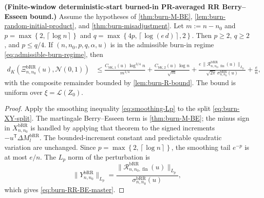 \begin{theorem}\label{thm:burn-RR-BE-master}
  \textbf{(Finite-window deterministic-start burned-in PR-averaged RR Berry--Esseen bound.)}
  Assume the hypotheses of \cref{thm:burn-M-BE}, \cref{lem:burn-random-initial-product},
  and \cref{thm:burn-misadjustment}. Let
  $m := n - n_{0}$ and
  $p = \max\left\{2, \left\lceil \log n \right\rceil\right\}$ and
  $q = \max\left\{4 p, \left\lceil \log\left(e \, d\right) \right\rceil, 2\right\}$. Then $p \ge 2$, $q \ge 2$, and
  $p \le q / 4$. If $(n,n_{0},p,q,\alpha,u)$ is in the admissible burn-in
  regime \eqref{eq:admissible-burn-regime}, then
  \begin{equation}
\begin{aligned}
d_{K} \left( \Xi_{n,n_{0}}^{\mathrm{bRR}}(u), \mathcal{N}(0, 1) \right)
    &\le \frac{C_{\mathrm{bK,1}}(u) \, \log^{3 / 4} n}{m^{1 / 4}}
     + \frac{C_{\mathrm{bK,2}}(u) \, \log n}{\sqrt{m}}
    + \frac{e \,
        \lVert \mathcal{R}_{n,n_{0}, \operatorname{fin}}^{\mathrm{bRR}}(u) \rVert_{L_{p}}}{\sqrt{2 \pi} \, \sigma_{n,n_{0}}^{\mathrm{bRR}}(u)}
     + \frac{e}{n},
\end{aligned}
\label{eq:burn-RR-BE-master}
\end{equation}
  with the composite remainder bounded by \cref{lem:burn-R-bound}. The bound is
  uniform over $\xi = \mathcal{L}(Z_{0})$.
\end{theorem}

\begin{proof} Apply the smoothing inequality \eqref{eq:smoothing-Lp} to the split
\eqref{eq:burn-XY-split}. The martingale Berry--Esseen term is \cref{thm:burn-M-BE}; the
minus sign in $X_{n,n_{0}}^{\mathrm{bRR}}$ is handled by applying that theorem to the
signed increments $-u^{\mathsf{T}} \Delta M_{l}^{\mathrm{bRR}}$. The bounded-increment constant
and predictable quadratic variation are unchanged. Since
$p = \max\left\{2, \left\lceil \log n \right\rceil\right\}$, the smoothing tail $e^{-p}$ is at most
$e / n$. The $L_{p}$ norm of the perturbation is
\[
\lVert Y_{n,n_{0}}^{\mathrm{bRR}} \rVert_{L_{p}}
  = \frac{\lVert \mathcal{R}_{n,n_{0}, \operatorname{fin}}^{\mathrm{bRR}}(u) \rVert_{L_{p}}}{\sigma_{n,n_{0}}^{\mathrm{bRR}}(u)},
\]
which gives \eqref{eq:burn-RR-BE-master}. \end{proof}
